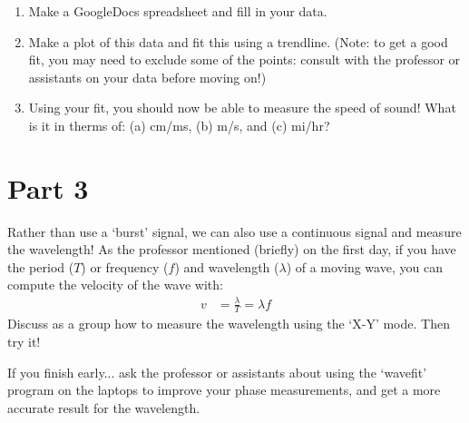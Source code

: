 \documentclass[12pt, letterpaper]{article}
\begin{document}
\begin{enumerate}
	\item Make a GoogleDocs spreadsheet and fill in your data.
	\item Make a plot of this data and fit this using a trendline.  
	(Note: to get a good fit, you may need to exclude some of the points: consult with the professor or assistants on your data before moving on!)
	\item Using your fit, you should now be able to measure the speed of sound!  What is it in therms of: (a) cm/ms, (b) m/s, and (c) mi/hr?
	
	\answergrid{5cm}
\end{enumerate}

\section{Part 3}
Rather than use a `burst' signal, we can also use a continuous signal and measure the wavelength!
As the professor mentioned (briefly) on the first day, if you have the period ($T$) or frequency ($f$) and wavelength ($\lambda$) of a moving wave, you can compute the velocity of the wave with:
\begin{align}
	v &= \frac{\lambda}{T} = \lambda f
\end{align}
Discuss as a group how to measure the wavelength using the `X-Y' mode.
Then try it!

If you finish early... ask the professor or assistants about using the `wavefit' program on the laptops to improve your phase measurements, and get a more accurate result for the wavelength.

\fillgrid

\clearpage

\fillgrid
\end{document}
